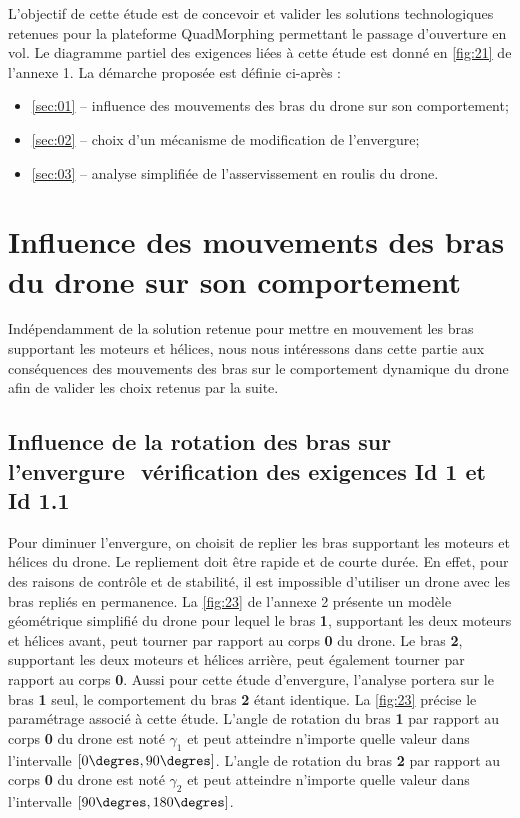 \begin{obj}
L'objectif de cette étude est de concevoir et valider les solutions technologiques retenues
pour la plateforme QuadMorphing permettant le passage d’ouverture en vol. Le diagramme
partiel des exigences liées à cette étude est donné en \autoref{fig:21} de l’annexe 1.
La démarche proposée est définie ci­-après :
\begin{itemize}
\item ­\autoref{sec:01} --­ influence des mouvements des bras du drone sur son comportement;
\item ­\autoref{sec:02} --­ choix d’un mécanisme de modification de l’envergure;
\item ­\autoref{sec:03} --­ analyse simplifiée de l’asservissement en roulis du drone.
\end{itemize}
\end{obj}

\section{\label{sec:01} Influence des mouvements des bras du drone sur son comportement}

Indépendamment de la solution retenue pour mettre en mouvement les bras supportant les
moteurs et hélices, nous nous intéressons dans cette partie aux conséquences des mouvements des bras sur le comportement dynamique du drone afin de valider les choix retenus
par la suite.

\subsection{Influence de la rotation des bras sur l’envergure ­ vérification des exigences Id 1
et Id 1.1}

Pour diminuer l’envergure, on choisit de replier les bras supportant les moteurs et hélices du
drone. Le repliement doit être rapide et de courte durée. En effet, pour des raisons de contrôle
et de stabilité, il est impossible d’utiliser un drone avec les bras repliés en permanence. La
\autoref{fig:23} de l’annexe 2 présente un modèle géométrique simplifié du drone pour lequel le
bras \textbf{1}, supportant les deux moteurs et hélices avant, peut tourner par rapport au corps \textbf{0} du
drone. Le bras \textbf{2}, supportant les deux moteurs et hélices arrière, peut également tourner par
rapport au corps \textbf{0}. Aussi pour cette étude d’envergure, l’analyse portera sur le bras \textbf{1} seul,
le comportement du bras \textbf{2} étant identique. La \autoref{fig:23} précise le paramétrage associé à
cette étude. L’angle de rotation du bras \textbf{1} par rapport au corps \textbf{0} du drone est noté $\gamma_1$ et peut
atteindre n’importe quelle valeur dans l’intervalle $[0\degres, 90\degres]$.
L’angle de rotation du bras \textbf{2} par rapport au corps \textbf{0} du drone est noté $\gamma_2$ et peut atteindre
n’importe quelle valeur dans l’intervalle $[90\degres, 180\degres]$.

